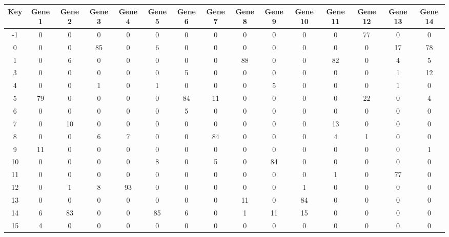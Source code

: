 \begin{tabular}{|c|c|c|c|c|c|c|c|c|c|c|c|c|c|c|}
\hline
Key & Gene 1 & Gene 2 & Gene 3 & Gene 4 & Gene 5 & Gene 6 & Gene 7 & Gene 8 & Gene 9 & Gene 10 & Gene 11 & Gene 12 & Gene 13 & Gene 14 \\
\hline
-1 & 0 & 0 & 0 & 0 & 0 & 0 & 0 & 0 & 0 & 0 & 0 & 77 & 0 & 0 \\
0 & 0 & 0 & 85 & 0 & 6 & 0 & 0 & 0 & 0 & 0 & 0 & 0 & 17 & 78 \\
1 & 0 & 6 & 0 & 0 & 0 & 0 & 0 & 88 & 0 & 0 & 82 & 0 & 4 & 5 \\
3 & 0 & 0 & 0 & 0 & 0 & 5 & 0 & 0 & 0 & 0 & 0 & 0 & 1 & 12 \\
4 & 0 & 0 & 1 & 0 & 1 & 0 & 0 & 0 & 5 & 0 & 0 & 0 & 1 & 0 \\
5 & 79 & 0 & 0 & 0 & 0 & 84 & 11 & 0 & 0 & 0 & 0 & 22 & 0 & 4 \\
6 & 0 & 0 & 0 & 0 & 0 & 5 & 0 & 0 & 0 & 0 & 0 & 0 & 0 & 0 \\
7 & 0 & 10 & 0 & 0 & 0 & 0 & 0 & 0 & 0 & 0 & 13 & 0 & 0 & 0 \\
8 & 0 & 0 & 6 & 7 & 0 & 0 & 84 & 0 & 0 & 0 & 4 & 1 & 0 & 0 \\
9 & 11 & 0 & 0 & 0 & 0 & 0 & 0 & 0 & 0 & 0 & 0 & 0 & 0 & 1 \\
10 & 0 & 0 & 0 & 0 & 8 & 0 & 5 & 0 & 84 & 0 & 0 & 0 & 0 & 0 \\
11 & 0 & 0 & 0 & 0 & 0 & 0 & 0 & 0 & 0 & 0 & 1 & 0 & 77 & 0 \\
12 & 0 & 1 & 8 & 93 & 0 & 0 & 0 & 0 & 0 & 1 & 0 & 0 & 0 & 0 \\
13 & 0 & 0 & 0 & 0 & 0 & 0 & 0 & 11 & 0 & 84 & 0 & 0 & 0 & 0 \\
14 & 6 & 83 & 0 & 0 & 85 & 6 & 0 & 1 & 11 & 15 & 0 & 0 & 0 & 0 \\
15 & 4 & 0 & 0 & 0 & 0 & 0 & 0 & 0 & 0 & 0 & 0 & 0 & 0 & 0 \\
\hline
\end{tabular}
